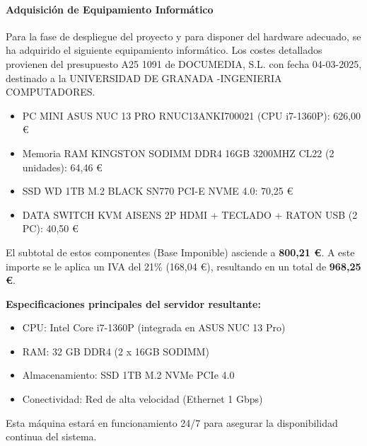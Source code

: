 \paragraph{Adquisición de Equipamiento Informático}
Para la fase de despliegue del proyecto y para disponer del hardware adecuado, se ha adquirido el siguiente equipamiento informático. Los costes detallados provienen del presupuesto A25 1091 de DOCUMEDIA, S.L. con fecha 04-03-2025, destinado a la UNIVERSIDAD DE GRANADA -INGENIERIA COMPUTADORES.
\begin{itemize}
    \item PC MINI ASUS NUC 13 PRO RNUC13ANKI700021 (CPU i7-1360P): 626,00 €
    \item Memoria RAM KINGSTON SODIMM DDR4 16GB 3200MHZ CL22 (2 unidades): 64,46 € 
    \item SSD WD 1TB M.2 BLACK SN770 PCI-E NVME 4.0: 70,25 € 
    \item DATA SWITCH KVM AISENS 2P HDMI + TECLADO + RATON USB (2 PC): 40,50 € 
\end{itemize}
El subtotal de estos componentes (Base Imponible) asciende a \textbf{800,21 €}. A este importe se le aplica un IVA del 21\% (168,04 €), resultando en un total de \textbf{968,25 €}.

\textbf{Especificaciones principales del servidor resultante:}
\begin{itemize}
    \item CPU: Intel Core i7-1360P (integrada en ASUS NUC 13 Pro) 
    \item RAM: 32 GB DDR4 (2 x 16GB SODIMM) 
    \item Almacenamiento: SSD 1TB M.2 NVMe PCIe 4.0 
    \item Conectividad: Red de alta velocidad (Ethernet 1 Gbps)
\end{itemize}
Esta máquina estará en funcionamiento 24/7 para asegurar la disponibilidad continua del sistema.

